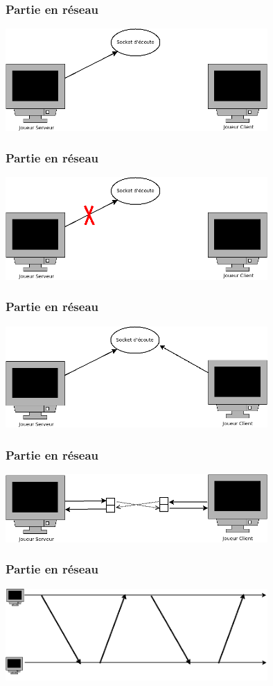 \documentclass{beamer}
\begin{document}
    \begin{frame}
        \frametitle{Partie en r\'eseau}
        \includegraphics[width=10cm]{ecoute.png}
    \end{frame}
    \begin{frame}
        \frametitle{Partie en r\'eseau}
        \includegraphics[width=10cm]{annuation.png}
    \end{frame}
    \begin{frame}
        \frametitle{Partie en r\'eseau}
        \includegraphics[width=10cm]{accept.png}
    \end{frame}
    \begin{frame}
        \frametitle{Partie en r\'eseau}
        \includegraphics[width=10cm]{echange.png}
    \end{frame}
    \begin{frame}
        \frametitle{Partie en r\'eseau}
        \includegraphics[width=10cm]{echangeOK.png}
    \end{frame}
\end{document}
